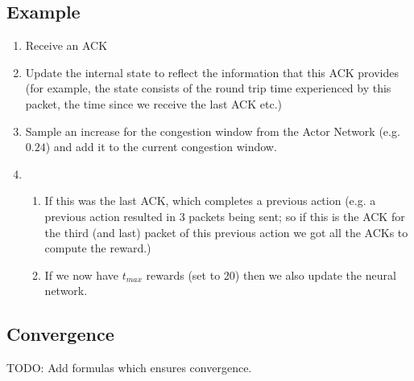 \documentclass[sigconf]{acmart}
\newcommand\note[2]{{\color{#1}#2}}
\newcommand\todo[1]{{\note{red}{TODO: #1}}}
\begin{document}
\subsection{Example}

\begin{enumerate}
\item Receive an ACK
\item Update the internal state to reflect the information that this ACK provides (for example, the state consists of the round trip time experienced by this packet, the time since we receive the last ACK etc.)
\item Sample an increase for the congestion window from the Actor Network (e.g. $0.24$) and add it to the current congestion window.
\item 
\begin{enumerate}
\item If this was the last ACK, which completes a previous action (e.g. a previous action resulted in $3$ packets being sent; so if this is the ACK for the third (and last) packet of this previous action we got all the ACKs to compute the reward.)
\item If we now have $t_{max}$ rewards (set to 20) then we also update the neural network. 
\end{enumerate}

\end{enumerate}

\subsection{Convergence}

\todo{Add formulas which ensures convergence.}
 


\end{document}
